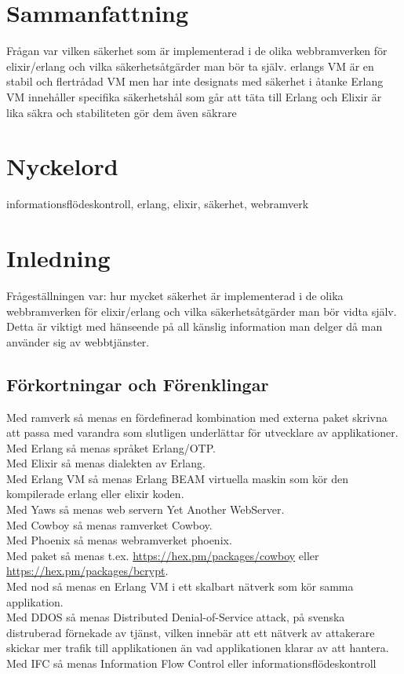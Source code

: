 \documentclass[12pt]{article}
\begin{document}
\maketitle

	 	 	 	 	
	
\section*{Sammanfattning}
Frågan var vilken säkerhet som är implementerad i de olika webbramverken för elixir/erlang och vilka säkerhetsåtgärder man bör ta själv.	
erlangs VM är en stabil och flertrådad VM men har inte designats med säkerhet i åtanke 
Erlang VM innehåller specifika säkerhetshål som går att täta till
Erlang och Elixir är lika säkra och stabiliteten gör dem även säkrare
	
\section*{Nyckelord}
informationsflödeskontroll, erlang, elixir, säkerhet, webramverk
	\section{Inledning}

Frågeställningen var: hur mycket säkerhet är implementerad i de olika webbramverken för elixir/erlang och vilka säkerhetsåtgärder man bör vidta själv. 
Detta är viktigt med hänseende på all känslig information man delger då man använder sig av webbtjänster.\\
\subsection*{Förkortningar och Förenklingar}
Med ramverk så menas en fördefinerad kombination med externa paket skrivna att passa med varandra som slutligen underlättar för utvecklare av applikationer.\\ 
Med Erlang så menas språket Erlang/OTP\cite{erlang}.\\ 
Med Elixir så menas dialekten av Erlang\cite{elixir}.\\ 
Med Erlang VM så menas Erlang BEAM virtuella maskin som kör den kompilerade erlang eller elixir koden\cite{erlang}.\\ 
Med Yaws så menas web servern Yet Another WebServer\cite{yawsorg}.\\ 
Med Cowboy så menas ramverket Cowboy\cite{cowboyorg}. \\ 
Med Phoenix så menas webramverket phoenix\cite{phoenixorg}.\\ 
Med paket så menas t.ex. \url{https://hex.pm/packages/cowboy}  
eller \url{https://hex.pm/packages/bcrypt}.\\ 
Med nod så menas en Erlang VM i ett skalbart nätverk som kör samma applikation.\\ 
Med DDOS så menas Distributed Denial-of-Service attack, på svenska distruberad förnekade av tjänst, vilken innebär att ett nätverk av attakerare skickar mer trafik till applikationen än vad applikationen klarar av att hantera.\\ 
Med IFC så menas Information Flow Control eller informationsflödeskontroll
\end{document}
